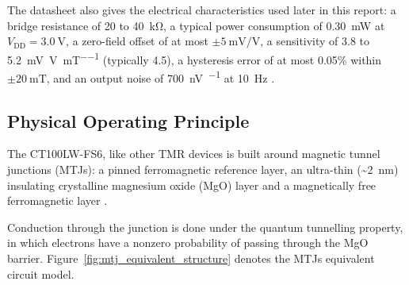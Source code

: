 \documentclass[12pt,a4paper]{article}
\begin{document}
The datasheet also gives the electrical characteristics used later in this report: a bridge resistance of 20 to \SI{40}{\kilo\ohm}, a typical power consumption of \SI{0.30}{\milli\watt} at $V_{\text{DD}} = \SI{3.0}{\volt}$, a zero-field offset of at most $\pm\SI{5}{\milli\volt\per\volt}$, a sensitivity of 3.8 to \SI{5.2}{\milli\volt\per\volt\per\milli\tesla} (typically 4.5), a hysteresis error of at most 0.05\% within $\pm\SI{20}{\milli\tesla}$, and an output noise of \SI{700}{\nano\volt\per\sqrt{\hertz}} at \SI{10}{\hertz} \cite{ct100_datasheet}.

\subsection{Physical Operating Principle}
\label{sec:ct100-principle}

The CT100LW-FS6, like other TMR devices is built around magnetic tunnel junctions (MTJs): a pinned ferromagnetic reference layer, an ultra-thin (\textasciitilde\SI{2}{\nano\metre}) insulating crystalline magnesium oxide (MgO) layer and a magnetically free ferromagnetic layer \cite{parkin2004,yuasa2004}. 

Conduction through the junction is done under the quantum tunnelling property, in which electrons have a nonzero probability of passing through the MgO barrier. Figure~\ref{fig:mtj_equivalent_structure} denotes the MTJs equivalent circuit model.
\end{document}
